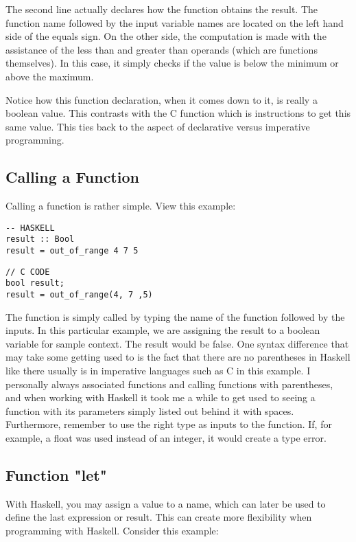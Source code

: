 \documentclass{article}
\begin{document}
\medskip\noindent
The second line actually declares how the function obtains the result. The function name followed by the input variable names are located on the left hand side of the equals sign. On the other side, the computation is made with the assistance of the less than and greater than operands (which are functions themselves). In this case, it simply checks if the value is below the minimum or above the maximum.

\medskip\noindent
Notice how this function declaration, when it comes down to it, is really a boolean value. This contrasts with the C function which is instructions to get this same value. This ties back to the aspect of declarative versus imperative programming.

\subsection{Calling a Function}
\medskip\noindent
Calling a function is rather simple. View this example:

\begin{lstlisting}[style=HaskellStyle]
-- HASKELL
result :: Bool
result = out_of_range 4 7 5
\end{lstlisting}

\begin{lstlisting}[style=CStyle]
// C CODE
bool result;
result = out_of_range(4, 7 ,5)
\end{lstlisting}

\medskip\noindent
The function is simply called by typing the name of the function followed by the inputs. In this particular example, we are assigning the result to a boolean variable for sample context. The result would be false. One syntax difference that may take some getting used to is the fact that there are no parentheses in Haskell like there usually is in imperative languages such as C in this example. I personally always associated functions and calling functions with parentheses, and when working with Haskell it took me a while to get used to seeing a function with its parameters simply listed out behind it with spaces. Furthermore, remember to use the right type as inputs to the function. If, for example, a float was used instead of an integer, it would create a type error.

\subsection{Function "let"}
\medskip\noindent
With Haskell, you may assign a value to a name, which can later be used to define the last expression or result. This can create more flexibility when programming with Haskell. Consider this example:
\end{document}
